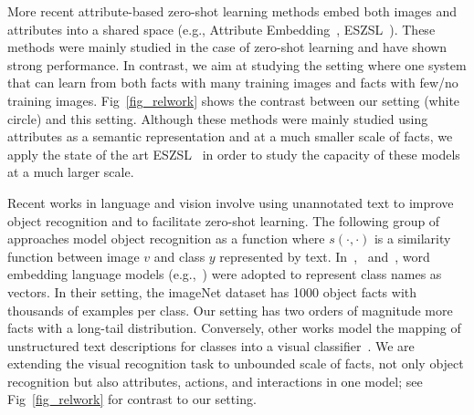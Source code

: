 \documentclass[runningheads]{llncs}
\begin{document}
More recent attribute-based zero-shot learning methods embed both images and attributes into a shared space (e.g.,  Attribute Embedding~\cite{akata2013label}, ESZSL~\cite{romera2015embarrassingly}). These methods were mainly studied in the case of zero-shot learning and have shown strong performance. In contrast, we aim at studying the setting where one system that can learn from both facts with many training images and facts with  few/no training images. Fig~\ref{fig_relwork} shows the contrast between our setting (white circle) and this setting. Although these methods were mainly studied using attributes as a semantic representation and at a much smaller scale of facts, we apply the state of the art ESZSL~\cite{romera2015embarrassingly} in order to study the capacity of these models at a much larger scale.


Recent works in language and vision involve using  unannotated text to improve object recognition and to facilitate zero-shot learning. The following group of  approaches model object recognition as a function
where $s(\cdot,\cdot)$ is a similarity function between image $v$ and class $y$ represented by text.
In~\cite{NIPS13DeViSE},~\cite{norouzi2014zero} and~\cite{NIPS13CMT},  word  embedding language models (e.g.,~\cite{mikolov2013distributed}) were adopted to represent class names as vectors.
In their setting, the imageNet dataset has 1000 object facts with thousands of examples per class.
Our setting has two orders of magnitude more facts with a long-tail distribution. Conversely, other works model the mapping of unstructured text descriptions for classes  into a visual classifier~\cite{elhoseiny2013write,ba2015predicting}. %
We are extending the visual recognition task to unbounded scale of facts,
not only object recognition but also attributes, actions, and interactions in one model;
see Fig~\ref{fig_relwork} for contrast to our setting. %
\end{document}
